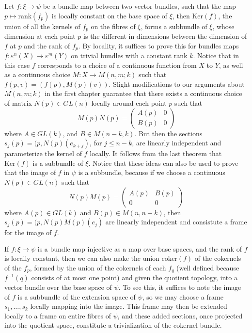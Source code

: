 \begin{example}
    Let $f: \xi \to \psi$ be a bundle map between two vector bundles, such that the map $p \mapsto \text{rank}(f_p)$ is locally constant on the base space of $\xi$, then $\text{Ker}(f)$, the union of all the kernels of $f_p$ on the fibres of $\xi$, forms a subbundle of $\xi$, whose dimension at each point $p$ is the different in dimensions between the dimension of $f$ at $p$ and the rank of $f_p$. By locality, it suffices to prove this for bundles maps $f: \varepsilon^n(X) \to \varepsilon^m(Y)$ on trivial bundles with a constant rank $k$. Notice that in this case $f$ corresponds to a choice of a continuous function from $X$ to $Y$, as well as a continuous choice $M: X \to M(n,m;k)$ such that $f(p,v) = (f(p), M(p)(v))$. Slight modifications to our arguments about $M(n,m;k)$ in the first chapter guarantee that there exists a continuous choice of matrix $N(p) \in GL(n)$ locally around each point $p$ such that
    \[ M(p)N(p) = \begin{pmatrix} A(p) & 0 \\ B(p) & 0 \end{pmatrix} \]
    where $A \in GL(k)$, and $B \in M(n-k,k)$. But then the sections $s_j(p) = (p, N(p)(e_{k+j})$, for $j \leq n-k$, are linearly independent and parameterize the kernel of $f$ locally. It follows from the last theorem that $\text{Ker}(f)$ is a subbundle of $\xi$. Notice that these ideas can also be used to prove that the image of $f$ in $\psi$ is a subbundle, because if we choose a continuous $N(p) \in GL(n)$ such that
    \[ N(p)M(p) = \begin{pmatrix} A(p) & B(p) \\ 0 & 0 \end{pmatrix} \]
    where $A(p) \in GL(k)$ and $B(p) \in M(n,n-k)$, then $s_j(p) = (p, N(p)M(p)(e_j)$ are linearly independent and consistute a frame for the image of $f$.
\end{example}

\begin{example}
    If $f: \xi \to \psi$ is a bundle map injective as a map over base spaces, and the rank of $f$ is locally constant, then we can also make the union $\text{coker}(f)$ of the cokernels of the $f_p$, formed by the union of the cokernels of each $f_q$ (well defined because $f^{-1}(q)$ consists of at most one point) and given the quotient topology, into a vector bundle over the base space of $\psi$. To see this, it suffices to note the image of $f$ is a subbundle of the extension space of $\psi$, so we may choose a frame $s_1, \dots, s_k$ locally mapping into the image. This frame may then be extended locally to a frame on entire fibres of $\psi$, and these added sections, once projected into the quotient space, constitute a trivialization of the cokernel bundle.
\end{example}


